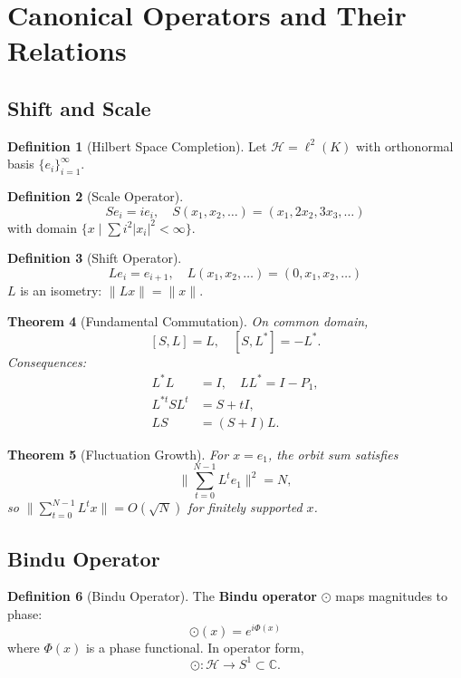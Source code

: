\documentclass[12pt, reqno]{amsart}
\theoremstyle{plain}
\newtheorem{theorem}{Theorem}[section]
\theoremstyle{definition}
\newtheorem{definition}[theorem]{Definition}
\theoremstyle{remark}
\newcommand{\cH}{\mathcal{H}}
\newcommand{\bC}{\mathbb{C}}
\newcommand{\bindu}{\odot}
\newcommand{\shift}{L}
\newcommand{\scale}{S}
\begin{document}
\section{Canonical Operators and Their Relations}

\subsection{Shift and Scale}

\begin{definition}[Hilbert Space Completion]
Let $\cH = \ell^2(K)$ with orthonormal basis $\{e_i\}_{i=1}^{\infty}$.
\end{definition}

\begin{definition}[Scale Operator]
\[
\scale e_i = i e_i, \quad \scale(x_1,x_2,\ldots) = (x_1,2x_2,3x_3,\ldots)
\]
with domain $\{ x \mid \sum i^2 |x_i|^2 < \infty \}$.
\end{definition}

\begin{definition}[Shift Operator]
\[
\shift e_i = e_{i+1}, \quad \shift(x_1,x_2,\ldots) = (0,x_1,x_2,\ldots)
\]
$\shift$ is an isometry: $\|\shift x\| = \|x\|$.
\end{definition}

\begin{theorem}[Fundamental Commutation]
On common domain,
\[
[\scale,\shift] = \shift, \quad [\scale,\shift^*] = -\shift^*.
\]
Consequences:
\begin{align*}
\shift^*\shift &= I, \quad \shift\shift^* = I - P_1, \\
\shift^{*t}\scale\shift^t &= \scale + tI, \\
\shift\scale &= (\scale + I)\shift.
\end{align*}
\end{theorem}

\begin{theorem}[Fluctuation Growth]
For $x = e_1$, the orbit sum satisfies
\[
\Big\| \sum_{t=0}^{N-1} \shift^t e_1 \Big\|^2 = N,
\]
so $\| \sum_{t=0}^{N-1} \shift^t x \| = O(\sqrt{N})$ for finitely supported $x$.
\end{theorem}

\subsection{Bindu Operator}

\begin{definition}[Bindu Operator]
The \textbf{Bindu operator} $\bindu$ maps magnitudes to phase:
\[
\bindu(x) = e^{i\Phi(x)}
\]
where $\Phi(x)$ is a phase functional. In operator form,
\[
\bindu: \cH \to S^1 \subset \bC.
\]
\end{definition}
\end{document}
